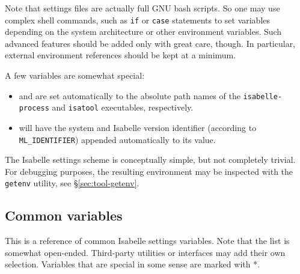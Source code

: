 Note that settings files are actually full GNU bash scripts. So one may use
complex shell commands, such as \texttt{if} or \texttt{case} statements to set
variables depending on the system architecture or other environment variables.
Such advanced features should be added only with great care, though. In
particular, external environment references should be kept at a minimum.

\medskip A few variables are somewhat special:
\begin{itemize}
\item {} and  are set automatically to the
  absolute path names of the \texttt{isabelle-process} and \texttt{isatool}
  executables, respectively.
  
\item {} will have the {\ML} system and Isabelle version
  identifier (according to \texttt{ML_IDENTIFIER}) appended automatically to
  its value.
\end{itemize}

\medskip The Isabelle settings scheme is conceptually simple, but not
completely trivial.  For debugging purposes, the resulting environment may be
inspected with the \texttt{getenv} utility, see \S\ref{sec:tool-getenv}.


\subsection{Common variables}

This is a reference of common Isabelle settings variables. Note that the list
is somewhat open-ended. Third-party utilities or interfaces may add their own
selection. Variables that are special in some sense are marked with *.

